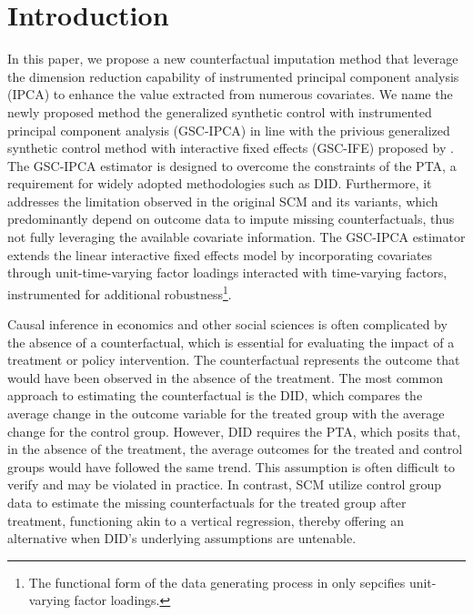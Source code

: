 \documentclass[12pt]{article}
\begin{document}
\section{Introduction} 
\label{sec:introduction}

In this paper, we propose a new counterfactual imputation method that leverage the dimension reduction capability of instrumented principal component analysis (IPCA) to enhance the value extracted from numerous covariates. We name the newly proposed method the generalized synthetic control with instrumented principal component analysis (GSC-IPCA) in line with the privious generalized synthetic control method with interactive fixed effects (GSC-IFE) proposed by \cite{xu2017generalized}. The GSC-IPCA estimator is designed to overcome the constraints of the PTA, a requirement for widely adopted methodologies such as DID. Furthermore, it addresses the limitation observed in the original SCM and its variants, which predominantly depend on outcome data to impute missing counterfactuals, thus not fully leveraging the available covariate information. The GSC-IPCA estimator extends the linear interactive fixed effects model by incorporating covariates through unit-time-varying factor loadings interacted with time-varying factors, instrumented for additional robustness\footnote{The functional form of the data generating process in \cite{xu2017generalized} only sepcifies unit-varying factor loadings.}.

Causal inference in economics and other social sciences is often complicated by the absence of a counterfactual, which is essential for evaluating the impact of a treatment or policy intervention. The counterfactual represents the outcome that would have been observed in the absence of the treatment. The most common approach to estimating the counterfactual is the DID, which compares the average change in the outcome variable for the treated group with the average change for the control group. However, DID requires the PTA, which posits that, in the absence of the treatment, the average outcomes for the treated and control groups would have followed the same trend. This assumption is often difficult to verify and may be violated in practice. In contrast, SCM utilize control group data to estimate the missing counterfactuals for the treated group after treatment, functioning akin to a vertical regression, thereby offering an alternative when DID's underlying assumptions are untenable. 
\end{document}
